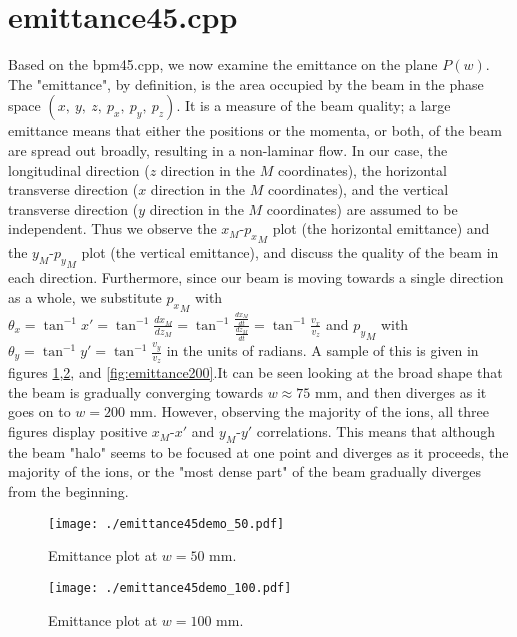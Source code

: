 \documentclass{article}
\begin{document}
\section{emittance45.cpp}
Based on the bpm45.cpp, we now examine the emittance on the plane $P(w)$. The "emittance", by definition, is the area occupied by the beam in the phase space $(x,\ y,\ z,\ p_x,\ p_y,\ p_z)$. It is a measure of the beam quality; a large emittance means that either the positions or the momenta, or both, of the beam are spread out broadly, resulting in a non-laminar flow. In our case, the longitudinal direction ($z$ direction in the $M$ coordinates), the horizontal transverse direction ($x$ direction in the $M$ coordinates), and the vertical transverse direction ($y$ direction in the $M$ coordinates) are assumed to be independent. Thus we observe the $x_M$-${p_x}_M$ plot (the horizontal emittance) and the $y_M$-${p_y}_M$ plot (the vertical emittance), and discuss the quality of the beam in each direction. Furthermore, since our beam is moving towards a single direction as a whole, we substitute ${p_x}_M$ with $\theta_x = \tan^{-1}{x'} = \tan^{-1}{\frac{dx_M}{dz_M}} = \tan^{-1}{\frac{\frac{dx_M}{dt}}{\frac{dz_M}{dt}}} = \tan^{-1}{\frac{v_x}{v_z}}$ and ${p_y}_M$ with $\theta_y = \tan^{-1}{y'} = \tan^{-1}{\frac{v_y}{v_z}}$ in the units of radians. A sample of this is given in figures \ref{fig:emittance50},\ref{fig:emittance100}, and \ref{fig:emittance200}.It can be seen looking at the broad shape that the beam is gradually converging towards $w \approx 75$ mm, and then diverges as it goes on to $w = 200$ mm. However, observing the majority of the ions, all three figures display positive $x_M$-$x'$ and $y_M$-$y'$ correlations. This means that although the beam "halo" seems to be focused at one point and diverges as it proceeds, the majority of the ions, or the "most dense part" of the beam gradually diverges from the beginning. 


\begin{figure}[H]
  \begin{center}
    \texttt{[image: ./emittance45demo\_50.pdf]}
    \caption{Emittance plot at $w = 50$ mm.\label{fig:emittance50}}
  \end{center}
\end{figure}

\begin{figure}[H]
  \begin{center}
    \texttt{[image: ./emittance45demo\_100.pdf]}
    \caption{Emittance plot at $w = 100$ mm.\label{fig:emittance100}}
  \end{center}
\end{figure}
\end{document}

